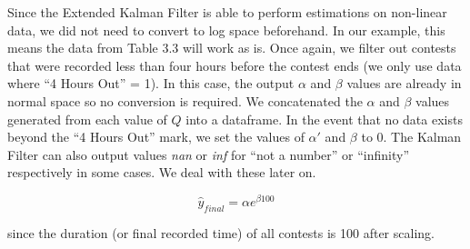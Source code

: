 Since the Extended Kalman Filter is able to perform estimations on non-linear data, we did not need to convert to log space beforehand. In our example, this means the data from Table 3.3 will work as is. Once again, we filter out contests that were recorded less than four hours before the contest ends (we only use data where ``4 Hours Out'' = 1). In this case, the output $\alpha$ and $\beta$ values are already in normal space so no conversion is required. We concatenated the $\alpha$ and $\beta$ values generated from each value of $Q$ into a dataframe. In the event that no data exists beyond the ``4 Hours Out'' mark, we set the values of $\alpha'$ and $\beta$ to 0. The Kalman Filter can also output values \textit{nan} or \textit{inf} for ``not a number'' or ``infinity'' respectively in some cases. We deal with these later on.


\begin{equation}
    \hat{y}_{final} = \alpha e^{\beta100}
\end{equation}

since the duration (or final recorded time) of all contests is 100 after scaling.